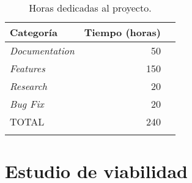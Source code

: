 \begin{longtable}[]{@{}lrr@{}}
\toprule
\begin{minipage}[b]{0.37\columnwidth}\raggedright\strut
Categoría\strut
\end{minipage} & \begin{minipage}[b]{0.37\columnwidth}\raggedright\strut
Tiempo (horas)\strut
\end{minipage}\tabularnewline
\midrule
\endhead
\begin{minipage}[t]{0.37\columnwidth}\raggedright\strut
\emph{Documentation}\strut
\end{minipage} & \begin{minipage}[t]{0.37\columnwidth}\raggedright\strut
50\strut
\end{minipage}\tabularnewline
\begin{minipage}[t]{0.37\columnwidth}\raggedright\strut
\emph{Features}\strut
\end{minipage} & \begin{minipage}[t]{0.37\columnwidth}\raggedright\strut
150\strut
\end{minipage}\tabularnewline
\begin{minipage}[t]{0.37\columnwidth}\raggedright\strut
\emph{Research}\strut
\end{minipage}& \begin{minipage}[t]{0.37\columnwidth}\raggedright\strut
20\strut
\end{minipage}\tabularnewline
\begin{minipage}[t]{0.37\columnwidth}\raggedright\strut
\emph{Bug Fix}\strut
\end{minipage} & \begin{minipage}[t]{0.37\columnwidth}\raggedright\strut
20\strut
\end{minipage}\tabularnewline
\midrule
\begin{minipage}[t]{0.37\columnwidth}\raggedright\strut
TOTAL\strut
\end{minipage} & \begin{minipage}[t]{0.37\columnwidth}\raggedright\strut
240\strut
\end{minipage}\tabularnewline
\bottomrule
\caption{Horas dedicadas al proyecto.}
\end{longtable}




\section{Estudio de viabilidad}

